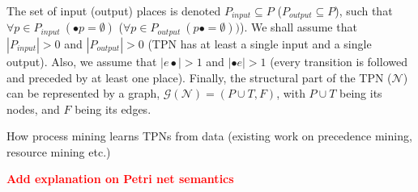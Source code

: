 \documentclass[11pt]{article}
\newcommand{\todo}[1]{\textcolor{red}{\bf {#1}}}
\begin{document}
The set of input (output) places is 
denoted $P_{input} \subseteq P$ ($P_{output} \subseteq P$), such that $\forall p \in P_{input} \ (\bullet p = \emptyset)$ ($\forall p \in P_{output} \ (p\bullet = \emptyset))$). We shall assume that $|P_{input}|>0$ and $|P_{output}|>0$ (TPN has at least a single input and a single output). Also, we assume that $|e\bullet|>1$ and $|\bullet e|>1$ (every transition is followed and preceded by at least one place). Finally, the structural part of the TPN ($\mathcal{N}$) can be represented by a graph, $\mathcal{G}(\mathcal{N}) = (P \cup T, F)$, with $P \cup T$ being its nodes, and $F$ being its edges.

How process mining learns TPNs from data (existing work on precedence mining, resource mining etc.)

\todo{Add explanation on Petri net semantics}


%
%
%
%
%
%
\end{document}
